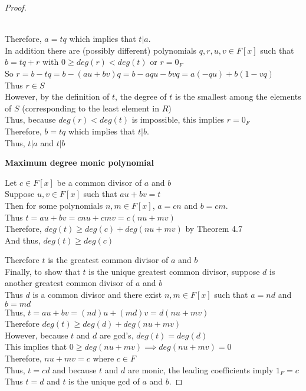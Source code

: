 \documentclass{article} %
\begin{document}
\begin{addmargin}[1em]{0em}
\begin{proof}
\begin{addmargin}[1em]{0em}
\\Therefore, $a = tq$ which implies that $t|a$.
\\In addition there are (possibly different) polynomials $q, r, u , v \in F[x]$ such that $b = tq + r$ with $0 \geq deg(r) < deg(t)$ or $r = 0_F$
\\So $r = b - tq = b - (au + bv)q = b - aqu - bvq = a(-qu) + b(1-vq)$
\\Thus $r \in S$
\\However, by the definition of $t$, the degree of $t$ is the smallest among the elements of $S$ (corresponding to the least element in $R$)
\\Thus, because $deg(r) < deg(t)$ is impossible, this implies $r = 0_F$
\\Therefore, $b = tq$ which implies that $t|b$.
\\Thus, $t|a$ and $t|b$
\end{addmargin}
\textbf{Maximum degree monic polynomial}
\begin{addmargin}[1em]{0em}
Let $c \in F[x]$ be a common divisor of $a$ and $b$
\\Suppose $u, v \in F[x]$ such that $au + bv = t$
\\Then for some polynomials $n, m \in F[x]$, $a = cn$ and $b = cm$.
\\Thus $t = au + bv = cnu + cmv = c(nu + mv)$
\\Therefore, $deg(t) \geq deg(c) + deg(nu + mv)$ by Theorem 4.7
\\And thus, $deg(t) \geq deg(c)$
\end{addmargin}
Therefore $t$ is the greatest common divisor of $a$ and $b$
\\Finally, to show that $t$ is the unique greatest common divisor, suppose $d$ is another greatest common divisor of $a$ and $b$
\\Thus $d$ is a common divisor and there exist $n,m \in F[x]$ such that $a = nd$ and $b = md$
\\Thus, $t = au + bv = (nd)u + (md)v = d(nu + mv)$
\\Therefore $deg(t) \geq deg(d) + deg(nu + mv)$
\\However, because $t$ and $d$ are gcd's, $deg(t) = deg(d)$
\\This implies that $0 \geq deg(nu + mv) \implies deg(nu + mv) = 0$
\\Therefore, $nu + mv = c$ where $c \in F$
\\Thus, $t = cd$ and because $t$ and $d$ are monic, the leading coefficients imply $1_F = c$
\\Thus $t = d$ and $t$ is the unique gcd of $a$ and $b$.
\end{proof}
\end{addmargin}
\newpage
\end{document}
